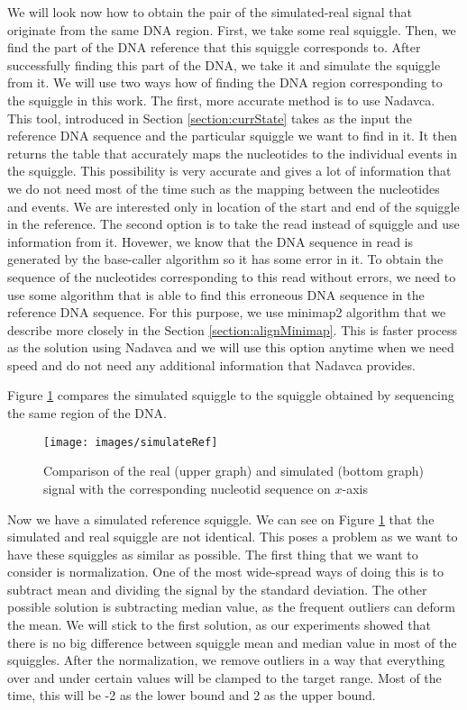 We will look now how to obtain the pair of the simulated-real signal that originate
from the same DNA region. First, we take some real squiggle.
Then, we find the part of the DNA reference that this squiggle corresponds to. After
successfully finding this part of the DNA, we take it and simulate the squiggle from it. We will use
two ways how of finding the DNA region corresponding to the squiggle in this work. The first, more accurate method is to
use Nadavca. This tool, introduced in Section \ref{section:currState} takes
as the input the reference DNA sequence and the particular squiggle we want to find
in it. It then returns the table that accurately maps the nucleotides to the individual
events in the squiggle. This possibility is very accurate and gives a lot of information
that we do not need most of the time such as the mapping between the nucleotides
and events. We are interested only in location of the start and end of the squiggle
in the reference. The second option is to take the read instead of squiggle and use information from it.
Hovewer, we know that the DNA sequence in read is generated by the base-caller algorithm so it has some error
in it. To obtain the sequence of the nucleotides corresponding to this read without
errors, we need to use some algorithm that is able to find this erroneous DNA
sequence in the reference DNA sequence. For this purpose, we use minimap2 algorithm
that we describe more closely in the Section \ref{section:alignMinimap}. This is faster
process as the solution using Nadavca and we will use this option anytime when we need
speed and do not need any additional information that Nadavca provides.

Figure \ref{obr:simVsReal} compares the simulated squiggle to the squiggle obtained
by sequencing the same region of the DNA.

\begin{figure}
\centerline{\texttt{[image: images/simulateRef]}}
\caption[TODO]{Comparison of the real (upper graph) and simulated (bottom graph) signal with the corresponding nucleotid sequence on $x$-axis}
\label{obr:simVsReal}
\end{figure}

Now we have a simulated reference squiggle. We can see on Figure \ref{obr:simVsReal} that the simulated and real
squiggle are not identical. This poses a problem as we want to have these squiggles as
similar as possible. The first thing that we want to consider is normalization.
One of the most wide-spread ways of doing this is to subtract mean and dividing
the signal by the standard deviation. The other possible solution is subtracting median value,
as the frequent outliers can deform the mean. We will stick to the first solution,
as our experiments showed that there is no big difference between squiggle mean
and median value in most of the squiggles.
After the normalization, we remove outliers in a way that everything over and under certain values will
be clamped to the target range. Most of the time, this will be -2 as the lower bound
and 2 as the upper bound.

